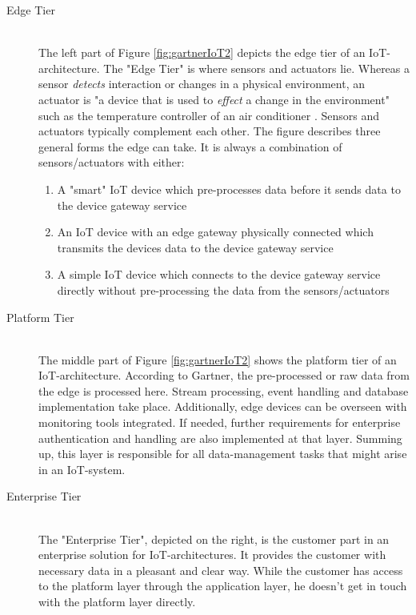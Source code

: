 \begin{description}
    \item[Edge Tier]\hfill \\ 
    The left part of Figure \ref{fig:gartnerIoT2} depicts the edge tier of an IoT-architecture.
    The "Edge Tier" is where sensors and actuators lie.
    Whereas a sensor \textit{detects} interaction or changes in a physical environment, an actuator is
    "a device that is used to \textit{effect} a change in the environment" such as the temperature 
    controller of an air conditioner \parencite{archsurv4}. 
    Sensors and actuators typically complement each other.
    The figure describes three general forms the edge can take. 
    It is always a combination of sensors/actuators with either:
    \begin{enumerate}
        \item A "smart" IoT device which pre-processes data before it sends data to the device gateway service
        \item An IoT device with an edge gateway physically connected which transmits the devices data to the device gateway service
        \item A simple IoT device which connects to the device gateway service directly without pre-processing the data from the sensors/actuators
    \end{enumerate}
    
    \item [Platform Tier] \hfill \\
    The middle part of Figure \ref{fig:gartnerIoT2} shows the platform tier of an IoT-architecture.
    According to Gartner, the pre-processed or raw data from the edge is processed here. %
    Stream processing, event handling and database implementation take place.
    Additionally, edge devices can be overseen with monitoring tools integrated. 
    If needed, further requirements for enterprise authentication and handling are also implemented at that layer.
    Summing up, this layer is responsible for all data-management tasks that might arise in an IoT-system.


    \item [Enterprise Tier] \hfill \\
    The "Enterprise Tier", depicted on the right, is the customer part in an enterprise solution for IoT-architectures.
    It provides the customer with necessary data in a pleasant and clear way.
    While the customer has access to the platform layer through the application layer, he doesn't get in touch with the platform layer directly.  %
\end{description}

